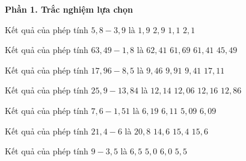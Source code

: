 \textbf{Phần 1. Trắc nghiệm lựa chọn}

\begin{ex} %
Kết quả của phép tính $5{,}8 - 3{,}9$ là
\choice
{\True $1{,}9$}
{$2{,}9$}
{$1{,}1$}
{$2{,}1$}
\end{ex}

\begin{ex} %
Kết quả của phép tính $63{,}49 - 1{,}8$ là
\choice
{$62{,}41$}
{\True $61{,}69$}
{$61{,}41$}
{$45{,}49$}
\end{ex}

\begin{ex} %
Kết quả của phép tính $17{,}96 - 8{,}5$ là
\choice
{\True $9{,}46$}
{$9{,}91$}
{$9{,}41$}
{$17{,}11$}
\end{ex}

\begin{ex} %
Kết quả của phép tính $25{,}9 - 13{,}84$ là
\choice
{$12{,}14$}
{\True $12{,}06$}
{$12{,}16$}
{$12{,}86$}
\end{ex}

\begin{ex} %
Kết quả của phép tính $7{,}6 - 1{,}51$ là
\choice
{$6{,}19$}
{$6{,}11$}
{$5{,}09$}
{\True $6{,}09$}
\end{ex}

\begin{ex} %
Kết quả của phép tính $21{,}4 - 6$ là
\choice
{$20{,}8$}
{$14{,}6$}
{\True $15{,}4$}
{$15{,}6$}
\end{ex}

\begin{ex} %
Kết quả của phép tính $9 - 3{,}5$ là
\choice
{$6{,}5$}
{$5{,}0$}
{$6{,}0$}
{\True $5{,}5$}
\end{ex}

